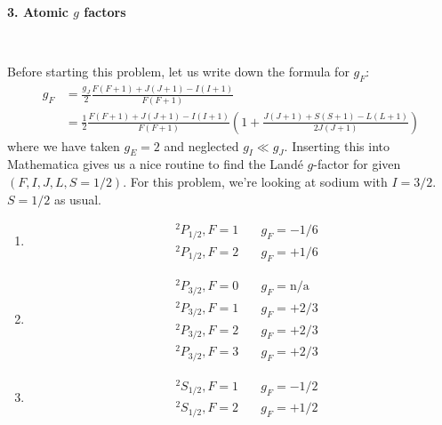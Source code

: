 \documentclass{article}
\theoremstyle{definition}
\newcommand{\f}[2]{\frac{#1}{#2}}
\newcommand{\lp}{\left(}
\newcommand{\rp}{\right)}
\begin{document}
\noindent \textbf{3. Atomic $g$ factors}

$\,$


\noindent Before starting this problem, let us write down the formula for $g_F$:
\begin{align*}
g_F &= \f{g_J}{2}\f{F(F+1) + J(J+1)-I(I+1)}{F(F+1)} \\
&= \f{1}{2}\f{F(F+1) + J(J+1)-I(I+1)}{F(F+1)}\lp 1 + \f{J(J+1)+S(S+1)-L(L+1)}{2J(J+1)} \rp
\end{align*} 
where we have taken $g_E = 2$ and neglected $g_I \ll g_J$. Inserting this into Mathematica gives us a nice routine to find the Land\'{e} $g$-factor for given $(F,I,J,L,S=1/2)$. For this problem, we're looking at sodium with $I=3/2$. $S=1/2$ as usual. 


\begin{enumerate}[label=(\alph*)]
	\item
	\begin{align*}
	&^2P_{1/2}, F=1 \quad& g_F = -1/6\\
	&^2P_{1/2}, F=2 \quad& g_F = +1/6
	\end{align*}
	
	\item 
	\begin{align*}
	&^2P_{3/2}, F=0 \quad& g_F = \text{n/a}\\
	&^2P_{3/2}, F=1 \quad& g_F = +2/3\\
	&^2P_{3/2}, F=2 \quad& g_F = +2/3\\
	&^2P_{3/2}, F=3 \quad& g_F = +2/3
	\end{align*}
	
	\item 
	\begin{align*}
	&^2S_{1/2}, F=1 \quad& g_F = -1/2\\
	&^2S_{1/2}, F=2 \quad& g_F = +1/2
	\end{align*}
	
	
	
\end{enumerate}
\end{document}
